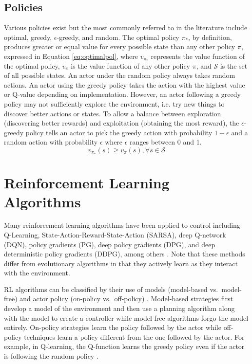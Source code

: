 \subsection{Policies}
Various policies exist but the most commonly referred to in the literature include optimal, greedy, $\epsilon$-greedy, and random. The optimal policy $\pi_*$, by definition, produces greater or equal value for every possible state than any other policy $\pi$, expressed in Equation \ref{eq:optimalpol}, where $v_{\pi_*}$ represents the value function of the optimal policy, $v_{\pi}$ is the value function of any other policy $\pi$, and $\mathcal{S}$ is the set of all possible states. An actor under the random policy always takes random actions. An actor using the greedy policy takes the action with the highest value or Q-value depending on implementation. However, an actor following a greedy policy may not sufficiently explore the environment, i.e. try new things to discover better actions or states. To allow a balance between exploration (discovering better rewards) and exploitation (obtaining the most reward), the $\epsilon$-greedy policy tells an actor to pick the greedy action with probability $1-\epsilon$ and a random action with probability $\epsilon$ where $\epsilon$ ranges between 0 and 1. 
\begin{equation}
	\label{eq:optimalpol}
v_{\pi_*}(s) \geq v_{\pi}(s), \forall s \in \mathcal{S}
\end{equation}

\section{Reinforcement Learning Algorithms}
Many reinforcement learning algorithms have been applied to control including Q-Learning, State-Action-Reward-State-Action (SARSA), deep Q-network (DQN), policy gradients (PG), deep policy gradients (DPG), and deep deterministic policy gradients (DDPG), among others \cite{sutton_2017}\cite{sutton_policygrad}\cite{silver_2017}\cite{silver_lever_heess_degris_wierstra_riedmiller}\cite{lillicrap_2016}. Note that these methods differ from evolutionary algorithms in that they actively learn as they interact with the environment.

RL algorithms can be classified by their use of models (model-based vs.\ model-free) and actor policy (on-policy vs.\ off-policy) \cite{sutton_2017}. Model-based strategies first develop a model of the environment and then use a planning algorithm along with the model to create a controller while model-free algorithms forgo the model entirely. On-policy strategies learn the policy followed by the actor while off-policy techniques learn a policy different from the one followed by the actor. For example, in Q-learning, the Q-function learns the greedy policy even if the actor is following the random policy \cite{sutton_2017}. 

